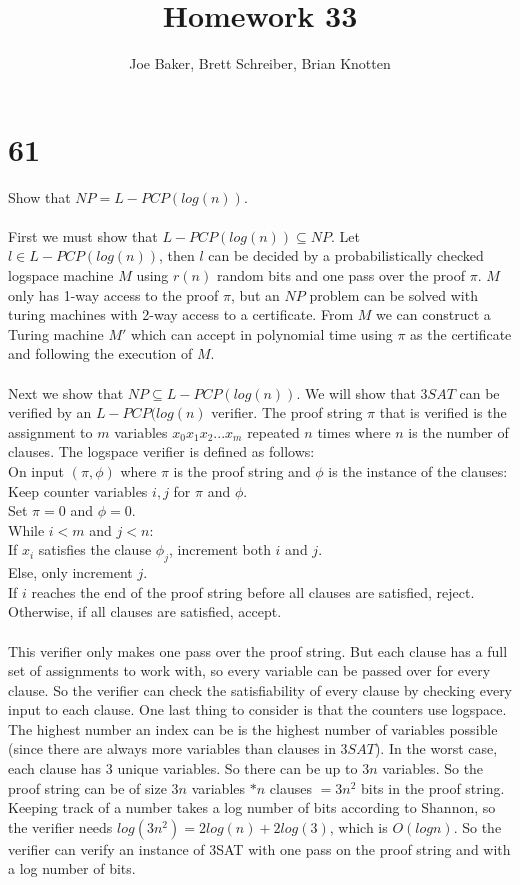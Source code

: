 \documentclass[letterpaper,notitlepage,twoside]{article}
\newcommand\tab[1][1cm]{\hspace*{#1}} %
\begin{document}
\title{Homework 33}
\author{Joe Baker, Brett Schreiber, Brian Knotten}
\maketitle

\section*{61}
Show that $NP = L-PCP(log(n))$.
\\\\
First we must show that $L-PCP(log(n)) \subseteq NP$. Let $l \in L-PCP(log(n))$, then $l$ can be decided by a probabilistically checked logspace machine $M$ using $r(n)$ random bits and one pass over the proof $\pi$. $M$ only has 1-way access to the proof $\pi$, but an $NP$ problem can be solved with turing machines with 2-way access to a certificate. From $M$ we can construct a Turing machine $M'$ which can accept in polynomial time using $\pi$ as the certificate and following the execution of $M$.
\\\\
Next we show that $NP \subseteq L-PCP(log(n))$. We will show that $3SAT$ can be verified by an $L-PCP(log(n)$ verifier. The proof string $\pi$ that is verified is the assignment to $m$ variables $x_0x_1x_2...x_m$ repeated $n$ times where $n$ is the number of clauses. The logspace verifier is defined as follows:\\
On input $(\pi, \phi)$ where $\pi$ is the proof string and $\phi$ is the instance of the clauses:\\
\tab Keep counter variables $i, j$ for $\pi$ and $\phi$. \\
\tab Set $\pi = 0$ and $\phi = 0$. \\
\tab While $i < m$ and $j < n$:\\
\tab\tab If $x_i$ satisfies the clause $\phi_j$, increment both $i$ and $j$.\\
\tab\tab Else, only increment $j$.\\
\tab If $i$ reaches the end of the proof string before all clauses are satisfied, reject.\\
\tab Otherwise, if all clauses are satisfied, accept.
\\\\
This verifier only makes one pass over the proof string. But each clause has a full set of assignments to work with, so every variable can be passed over for every clause. So the verifier can check the satisfiability of every clause by checking every input to each clause. One last thing to consider is that the counters use logspace. The highest number an index can be is the highest number of variables possible (since there are always more variables than clauses in $3SAT$). In the worst case, each clause has 3 unique variables. So there can be up to $3n$ variables. So the proof string can be of size $3n$ variables $* n$ clauses $= 3n^2$ bits in the proof string. Keeping track of a number takes a log number of bits according to Shannon, so the verifier needs $log(3n^2) = 2log(n) + 2log(3)$, which is $O(log n)$. So the verifier can verify an instance of 3SAT with one pass on the proof string and with a log number of bits.
\\\\
\end{document}
